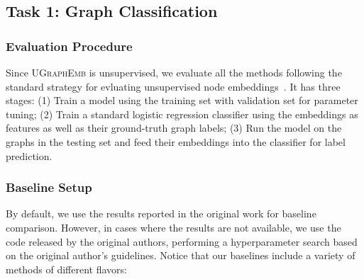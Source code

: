 \documentclass{article}
\newcommand{\model}{\textsc{UGraphEmb}\xspace}
\begin{document}
\subsection{Task 1: Graph Classification}

\subsubsection{Evaluation Procedure}

Since \model is unsupervised, we evaluate all the methods following the standard strategy for evluating unsupervised node embeddings~\cite{tang2015line,wang2016structural}. It has three stages: (1) Train a model using the training set with validation set for parameter tuning; (2) Train a standard logistic regression classifier using the embeddings as features as well as their ground-truth graph labels; (3) Run the model on the graphs in the testing set and feed their embeddings into the classifier for label prediction. 

\subsubsection{Baseline Setup}
\label{subsec-baseline-setup}

By default, we use the results reported in
the original work for baseline comparison. However, in cases where the results are not available, we use the code released by the original authors, performing a hyperparameter search based on the original author's guidelines. Notice that our baselines include a variety of methods of different flavors:
\end{document}
